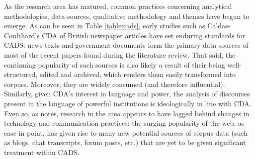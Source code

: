 \nocite{salahshour2016liquidmetaphors,bartley2016evaluation,jaworska2016using,koteyko2015corpus,schroter2015patterns,koteyko2014language,piotti2014exploring}

As the research area has matured, common practices concerning analytical methodologies, data\hyp{}sources, qualitative methodology and themes have begun to emerge. As can be seen in Table \ref{table:cads}, early studies such as Caldas\hyp{}Coulthard's \cite*{caldas-coulthard_discourse_1993} \gls{CDA} of British newspaper articles have set enduring standards for \gls{CADS}: news\hyp{}texts and government documents form the primary data\hyp{}sources of most of the recent papers found during the literature review. That said, the continuing popularity of such sources is also likely a result of their being well-structured, edited and archived, which renders them easily transformed into \glspl{corpus}. Moreover, they are widely consumed (and therefore influential). Similarly, given \gls{CDA}'s interest in language and power, the analysis of discourses present in the language of powerful institutions is ideologically in line with \gls{CDA}. Even so, as \textcite{mautner_time_2005} notes, research in the area appears to have lagged behind changes in technology and communication practices: the surging popularity of the web, as case in point, has given rise to many new potential sources of corpus data (such as blogs, chat transcripts, forum posts, etc.) that are yet to be given significant treatment within \gls{CADS}.


